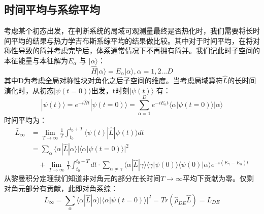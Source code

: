 \subsection{时间平均与系综平均}
考虑某个初态出发，在判断系统的局域可观测量最终是否热化时，我们需要将长时间平均的结果与热力学吉布斯系综平均的结果做比较。其中对于时间平均，在将对称性导致的简并考虑完毕后，体系通常情况下不再拥有简并。我们记此时子空间的本征能量与本征解为$E_\alpha$ 与 $|\alpha\rangle$：
\begin{equation}
\hat{H} |\alpha\rangle = E_\alpha |\alpha\rangle, \alpha=1,2...D
\end{equation}
其中D为考虑全局对称性块对角化之后子空间的维度。当考虑局域算符$\hat{L}$的长时间演化时，从初态$|\psi(t=0)\rangle$出发，t时刻$|\psi(t)\rangle$ 有：
\begin{equation}
|\psi(t)\rangle = e^{-i\hat{H}t}|\psi(t=0)\rangle = \sum_{\alpha=1}^D e^{-i E_\alpha t} \langle\alpha|\psi(t=0) \rangle  |\alpha\rangle
\end{equation}
时间平均为：
\begin{equation}
\begin{split}
	\bar{L}_{\infty}  &= \lim_{T\to \infty} \frac{1}{T} \int_{t_0}^{t_0+T} \langle\psi(t)|\hat{L}|\psi(t)\rangle dt \\
		\quad &=  \sum_{\alpha} \langle\alpha|\hat{L}|\alpha\rangle |\langle\alpha|\psi(t=0)\rangle|^2 \\ 
	&\quad+  \lim_{T\to \infty} \frac{1}{T} \int_{t_0}^{t_0+T} dt  \cdot\sum_{\alpha\neq\gamma} \langle\alpha|\hat{L}|\gamma\rangle \langle\gamma|\psi(0)\rangle \langle\psi(0)|\alpha\rangle e^{-i(E_\gamma-E_\alpha)t}
\end{split}
\end{equation}
从黎曼积分定理我们知道非对角元的部分在长时间$T\to\infty$平均下贡献为零。仅剩对角元部分有贡献，此即对角系综：
\begin{equation}
	\bar{L}_{\infty} =  \sum_{\alpha} \langle\alpha|\hat{L}|\alpha\rangle |\langle\alpha|\psi(t=0)\rangle|^2  = Tr(\hat{\rho}_{DE}\hat{L}) = \bar{L}_{DE}
\end{equation}

